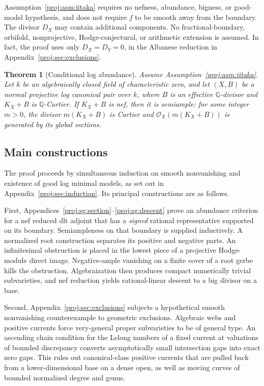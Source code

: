 \documentclass[11pt,letterpaper]{article}
\newtheorem{theorem}{Theorem}[section]
\theoremstyle{definition}
\theoremstyle{remark}
\begin{document}
Assumption~\ref{proj:asm:iitaka} requires no nefness, abundance, bigness,
or good-model hypothesis, and does not require \(f\) to be smooth
away from the boundary. The divisor \(D_X\) may contain additional
components. No fractional-boundary,
orbifold, nonprojective, Hodge-conjectural, or arithmetic extension is
assumed. In fact, the proof uses only \(D_X=D_Y=0\), in the Albanese
reduction in Appendix~\ref{proj:sec:exclusions}.

\begin{theorem}[Conditional log abundance]\label{proj:thm:main}\label{proj:main}\label{proj:conditional-log-abundance}
Assume Assumption~\ref{proj:asm:iitaka}. Let \(k\) be an algebraically closed
field of characteristic zero, and let \((X,B)\) be a normal projective log
canonical pair over \(k\), where \(B\) is an effective \(\mathbb{Q}\)-divisor
and \(K_X+B\) is \(\mathbb{Q}\)-Cartier. If \(K_X+B\) is nef, then it is
semiample: for some integer \(m>0\), the divisor \(m(K_X+B)\) is
Cartier and \(\mathcal{O}_X(m(K_X+B))\) is generated by its global sections.
\end{theorem}

\subsection{Main constructions}

The proof proceeds by simultaneous induction on smooth nonvanishing
and existence of good log minimal models, as set out in
Appendix~\ref{proj:sec:induction}. Its principal constructions are as follows.

First, Appendices~\ref{proj:sg:section}--\ref{proj:sg:descent} prove an abundance
criterion for a nef reduced dlt adjoint
that has a \emph{signed} rational representative supported on its
boundary. Semiampleness on that boundary is supplied inductively.
A normalized root construction separates its positive and negative
parts. An infinitesimal obstruction is placed in the lowest piece of
a projective Hodge-module direct image. Negative-ample vanishing on
a finite cover of a root gerbe kills the obstruction. Algebraization
then produces compact numerically trivial subvarieties, and nef
reduction yields rational-linear descent to a big divisor on a base.

Second, Appendix~\ref{proj:sec:exclusions} subjects a hypothetical smooth
nonvanishing counterexample to geometric exclusions. Algebraic webs and positive currents force
very-general proper subvarieties to be of general type. An ascending
chain condition for the Lelong numbers of a fixed current at valuations
of bounded discrepancy converts asymptotically small intersection gaps
into exact zero gaps. This rules out canonical-class positive currents
that are pulled back from a lower-dimensional base on a dense open,
as well as moving curves of bounded normalized degree and genus.
\end{document}
